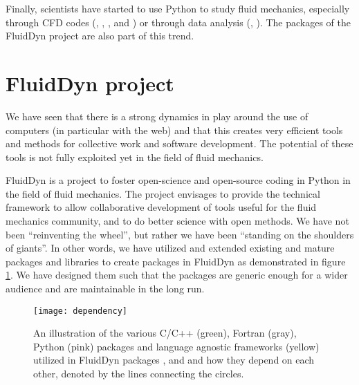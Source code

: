 Finally, scientists have started to use Python to study fluid mechanics,
especially through CFD codes (,
,
, 
and ) or through data analysis
(,
).
%
The packages of the FluidDyn project are also part of this trend.

\section{FluidDyn project}
We have seen that there is a strong dynamics in play around the use of
computers (in particular with the web) and that this creates very efficient
tools and methods for collective work and software development.
%
The potential of these tools is not fully exploited yet in the field of fluid
mechanics.

FluidDyn is a project to foster open-science and open-source coding in Python
in the field of fluid mechanics.
%
The project envisages to provide the technical framework to allow collaborative
development of tools useful for the fluid mechanics community, and to do better
science with open methods.
%
We have not been ``reinventing the wheel'', but rather we have been ``standing
on the shoulders of giants''. In other words, we have utilized and extended
existing and mature packages and libraries to create packages in FluidDyn as
demonstrated in figure \ref{fig:dependency}. We have designed them such that
the packages are generic enough for a wider audience and are maintainable in
the long run.

\begin{figure}[h]
  \centering
  \texttt{[image: dependency]}
  \caption{An illustration of the various C/C++ (green), Fortran (gray), Python
  (pink) packages and language agnostic frameworks (yellow) utilized in
  FluidDyn packages ,  and  and
  how they depend on each other, denoted by the lines connecting the
  circles.}\label{fig:dependency}
\end{figure}

